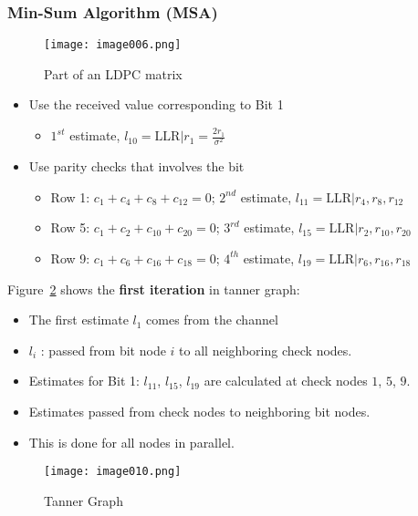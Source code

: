 \subsubsection{Min-Sum Algorithm (MSA)} 
\begin{figure}[ht]
    \centering
    \texttt{[image: image006.png]}
    \caption{Part of an LDPC matrix}
    \label{fig:ldpc matrix}
\end{figure}

\begin{itemize}
    \item Use the received value corresponding to Bit 1
    \begin{itemize}
        \item $1^{st}$ estimate, $l_{10} = \text{LLR} | r_1 = \frac{2r_1}{\sigma^2}$
    \end{itemize}
    \item Use parity checks that involves the bit
    \begin{itemize}
        \item Row 1: $c_1 + c_4 + c_8 + c_{12} = 0$; $2^{nd}$ estimate, $l_{11} = \text{LLR} | r_4 , r_8 , r_{12}$
        \item Row 5: $c_1 + c_2 + c_{10} + c_{20} = 0$; $3^{rd}$ estimate, $l_{15} = \text{LLR} | r_2 , r_{10} , r_{20}$
        \item Row 9: $c_1 + c_6 + c_{16} + c_{18} = 0$; $4^{th}$ estimate, $l_{19} = \text{LLR} | r_6 , r_{16} , r_{18}$
    \end{itemize}
\end{itemize}

Figure~\ref{fig:tanner graph ldpc} shows the \textbf{first iteration} in tanner graph:
\begin{itemize}
    \item The first estimate $l_1$ comes from the channel
    \item $l_i$ : passed from bit node $i$ to all neighboring check nodes.
    \item Estimates for Bit 1: $l_{11}$, $l_{15}$, $l_{19}$ are calculated at check nodes $1$, $5$, $9$.
    \item Estimates passed from check nodes to neighboring bit nodes.
    \item This is done for all nodes in parallel.
\end{itemize}

\begin{figure}[ht]
    \centering
    \texttt{[image: image010.png]}
    \caption{Tanner Graph}
    \label{fig:tanner graph ldpc}
\end{figure}


